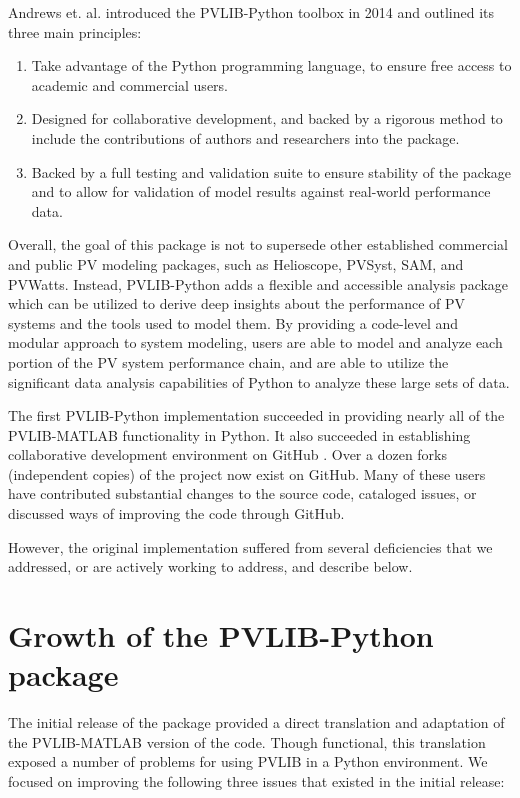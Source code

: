 \documentclass[conference]{IEEEtran}
\begin{document}
Andrews et. al. \cite{andrews} introduced the PVLIB-Python toolbox in 2014 and outlined its three main principles:

\begin{enumerate}
\item Take advantage of the Python programming language, to ensure free access to academic and commercial users.
\item Designed for collaborative development, and backed by a rigorous method to include the contributions of authors and researchers into the package.
\item Backed by a full testing and validation suite to ensure stability of the package and to allow for validation of model results against real-world performance data.
\end{enumerate}

Overall, the goal of this package is not to supersede other established commercial and public PV modeling packages, such as Helioscope, PVSyst, SAM, and PVWatts. 
Instead, PVLIB-Python adds a flexible and accessible analysis package which can be utilized to derive deep insights about the performance of PV systems and the tools used to model them.
By providing a code-level and modular approach to system modeling, users are able to model and analyze each portion of the PV system performance chain, and are able to utilize the significant data analysis capabilities of Python to analyze these large sets of data. 

The first PVLIB-Python implementation succeeded in providing nearly all of the PVLIB-MATLAB functionality in Python.
It also succeeded in establishing collaborative development environment on GitHub \cite{pvlib-github}. 
Over a dozen forks (independent copies) of the project now exist on GitHub. 
Many of these users have contributed substantial changes to the source code, cataloged issues, or discussed ways of improving the code through GitHub.

However, the original implementation suffered from several deficiencies that we addressed, or are actively working to address, and describe below. 



\section{Growth of the PVLIB-Python package}

The initial release of the package provided a direct translation and adaptation of the PVLIB-MATLAB version of the code.
Though functional, this translation exposed a number of problems for using PVLIB in a Python environment.
We focused on improving the following three issues that existed in the initial release:
\end{document}
